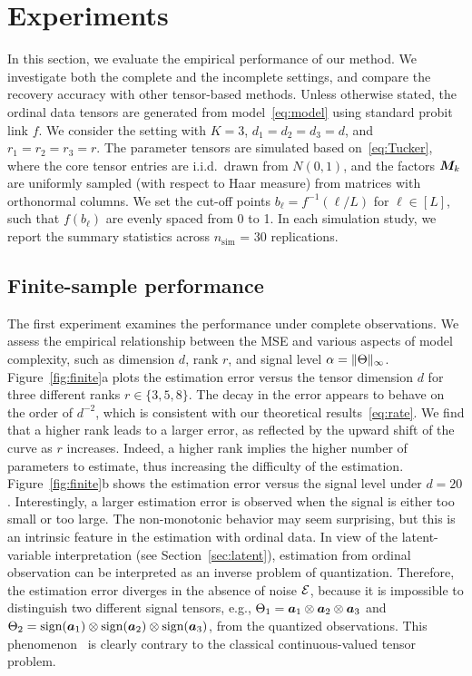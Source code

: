 \documentclass[11pt]{article}
\theoremstyle{plain}
\theoremstyle{definition}
\begin{document}
\section{Experiments}\label{sec:experiment}
In this section, we evaluate the empirical performance of our method. We investigate both the complete and the incomplete settings, and compare the recovery accuracy with other tensor-based methods. Unless otherwise stated, the ordinal data tensors are generated from model~\eqref{eq:model} using standard probit link $f$. We consider the setting with $K=3$, $d_1=d_2=d_3=d$, and $r_1=r_2=r_3=r$. The parameter tensors are simulated based on~\eqref{eq:Tucker}, where the core tensor entries are i.i.d.\ drawn from $N(0,1)$, and the factors $\bm M_k$ are uniformly sampled (with respect to Haar measure) from matrices with orthonormal columns. We set the cut-off points $b_\ell=f^{-1}(\ell/L)$ for $\ell\in[L]$, such that $f(b_\ell)$ are evenly spaced from 0 to 1. In each simulation study, we report the summary statistics across $n_{\text{sim}}$ = 30 replications.

\subsection{Finite-sample performance}\label{sec:simulation}
The first experiment examines the performance under complete observations. We assess the empirical relationship between the MSE and various aspects of model complexity, such as dimension $d$, rank $r$, and signal level $\alpha=\lVert\Theta\rVert_\infty$. Figure~\ref{fig:finite}a plots the estimation error versus the tensor dimension $d$ for three different ranks $r\in\{3,5,8\}$. The decay in the error appears to behave on the order of $d^{-2}$, which is consistent with our theoretical results~\eqref{eq:rate}. We find that a higher rank leads to a larger error, as reflected by the upward shift of the curve as $r$ increases. Indeed, a higher rank implies the higher number of parameters to estimate, thus increasing the difficulty of the estimation. Figure~\ref{fig:finite}b shows the estimation error versus the signal level under $d=20$. Interestingly, a larger estimation error is observed when the signal is either too small or too large. The non-monotonic behavior may seem surprising, but this is an intrinsic feature in the estimation with ordinal data. In view of the latent-variable interpretation (see Section~\ref{sec:latent}), estimation from ordinal observation can be interpreted as an inverse problem of quantization. Therefore, the estimation error diverges in the absence of noise $\mathcal{E}$, because it is impossible to distinguish two different signal tensors, e.g., $\Theta_1=\bm{a}_1\otimes \bm{a}_2\otimes \bm{a}_3$ and $\Theta_2=\text{sign}(\bm{a}_1)\otimes \text{sign}(\bm{a}_2)\otimes \text{sign}(\bm{a}_3)$, from the quantized observations. This phenomenon~\cite{davenport2014,sur2019modern} is clearly contrary to the classical continuous-valued tensor problem.
\end{document}
